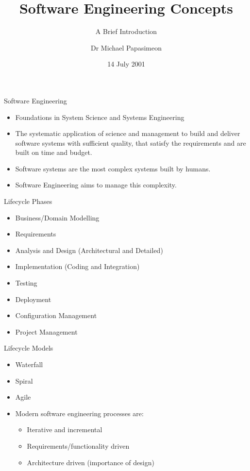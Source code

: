 \documentclass[aspectratio=1610,xcolor=dvipsnames,t,compress]{beamer}
\title[Software Engineering]{Software Engineering Concepts}
\subtitle{A Brief Introduction}
\author[Michael Papasimeon]{Dr Michael Papasimeon}
\date{14 July 2001}
\begin{document}
\begin{frame}
    \maketitle
\end{frame} 

\begin{frame}{Software Engineering}
    \begin{itemize}
        \item Foundations in System Science and Systems Engineering
        \item The systematic application of science and management to 
              build and deliver software systems with sufficient 
              quality, that satisfy the requirements and are 
              built on time and budget.
        \item Software systems are the most complex systems built by humans. 
        \item Software Engineering aims to manage this complexity.
    \end{itemize}
\end{frame}

\begin{frame}{Lifecycle Phases}
    \begin{itemize}
        \item Business/Domain Modelling 
        \item Requirements
        \item Analysis and Design (Architectural and Detailed)
        \item Implementation (Coding and Integration)
        \item Testing
        \item Deployment
        \item Configuration Management
        \item Project Management
    \end{itemize}
\end{frame}

\begin{frame}{Lifecycle Models}
    \begin{itemize}
        \item Waterfall
        \item Spiral
        \item Agile
        \item Modern software engineering processes are:
            \begin{itemize}
                \item Iterative and incremental
                \item Requirements/functionality driven
                \item Architecture driven (importance of design)
            \end{itemize}
    \end{itemize}
\end{frame} 
\end{document}

